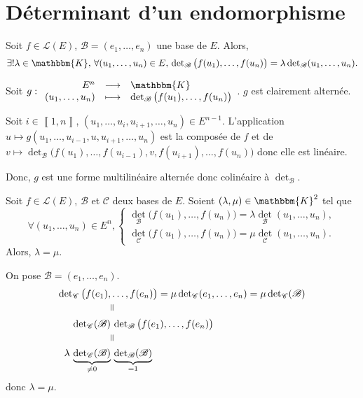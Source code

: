 \part{Déterminant d'un endomorphisme}

\begin{prop}
	Soit $f \in \mathcal{L}(E)$, $\mathcal{B} = (e_1, \ldots, e_n)$ une base de $E$. Alors, \[
		\exists ! \lambda \in \mathbbm{K},\, \forall (u_1, \ldots, u_n) \in E,\,
		\det_\mathcal{B}\big(f(u_1),\ldots,f(u_n)\big) = \lambda \det_\mathcal{B}(u_1, \ldots, u_n).
	\]
\end{prop}

\begin{prv}
	Soit $g : \begin{array}{rcl}
		E^n &\longrightarrow& \mathbbm{K} \\
		(u_1, \ldots,u_n) &\longmapsto& \det_\mathcal{B}\big(f(u_1),\ldots, f(u_n)\big)
	\end{array}$.
	$g$ est clairement alternée.

	Soit $i \in \left\llbracket 1,n \right\rrbracket$, $(u_1, \ldots, u_i, u_{i+1}, \ldots, u_n) \in E^{n-1}$.
	L'application $u\mapsto g(u_1, \ldots, u_{i-1}, u, u_{i+1}, \ldots, u_n)$ est la composée de $f$ et de $v \mapsto \det_\mathcal{B}\big(f(u_1), \ldots, f(u_{i-1}), v, f(u_{i+1}), \ldots, f(u_n)\big)$ donc elle est linéaire.

	Donc, $g$ est une forme multilinéaire alternée donc colinéaire à $\det_\mathcal{B}$.
\end{prv}

\begin{prop}
	Soit $f \in \mathcal{L}(E)$, $\mathcal{B}$ et $\mathcal{C}$ deux bases de $E$. Soient $(\lambda, \mu) \in \mathbbm{K}^2$ tel que \[
		\forall (u_1, \ldots, u_n) \in E^n,
		\begin{cases}
			\det_\mathcal{B}\big(f(u_1), \ldots, f(u_n)\big) = \lambda \det_\mathcal{B}(u_1, \ldots, u_n),\\
			\det_\mathcal{C}\big(f(u_1), \ldots, f(u_n)\big) = \mu \det_\mathcal{C}(u_1, \ldots, u_n).
		\end{cases}
	\] Alors, $\lambda = \mu$.
\end{prop}

\begin{prv}
	On pose $\mathcal{B} = (e_1, \ldots, e_n)$.
	\begin{align*}
		\det_\mathcal{C}\big(f(e_1),&\ldots, f(e_n)\big) = \mu \det_\mathcal{C}(e_1, \ldots, e_n) = \mu \det_\mathcal{C}(\mathcal{B})\\
		&\vrt=\\
		\det_\mathcal{C}(\mathcal{B})&\,\det_\mathcal{B}\big(f(e_1), \ldots, f(e_n)\big)\\
		&\vrt=\\
		\lambda\,\underbrace{\det_\mathcal{C}(\mathcal{B})}_{\neq 0}&\,\underbrace{\det_\mathcal{B}(\mathcal{B})}_{=1}
	\end{align*}
	donc $\lambda = \mu$.
\end{prv}


